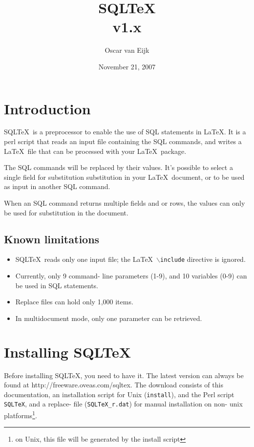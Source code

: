 \documentclass{article}
\newcommand{\bs}{\ensuremath{\backslash}}
\begin{document}
\title{SQL\TeX\\v1.x}
\date{November 21, 2007}
\author{Oscar van Eijk}

\maketitle

\hrulefill

\tableofcontents

\hrulefill

\section{Introduction}

SQL\TeX\ is a preprocessor to enable the use of SQL statements in \LaTeX. It is a perl script that reads
an input file containing the SQL commands, and writes a \LaTeX\ file that can be processed with your
\LaTeX\ package.

The SQL commands will be replaced by their values. It's possible to select a single field for substitution
substitution in your \LaTeX\ document, or to be used as input in another SQL command.

When an SQL command returns multiple fields and or rows, the values can only be used for substitution
in the document.

\subsection{Known limitations}

\begin{itemize}
\item SQL\TeX\ reads only one input file; the \LaTeX\ \texttt{\bs include} directive is ignored.
\item Currently, only 9 command- line parameters (1-9), and 10 variables (0-9) can be used in SQL
statements.
\item Replace files can hold only 1,000 items.
\item In multidocument mode, only one parameter can be retrieved.
\end{itemize}

\section{Installing SQL\TeX}

Before installing SQL\TeX, you need to have it. The latest version can always be found at
\textsf{http://freeware.oveas.com/sqltex}.
The download consists of this do\-cumentation, an installation script for Unix
(\texttt{install}), and the Perl script \texttt{SQLTeX}, and a replace- file (\texttt{SQLTeX\_r.dat}) for manual installation
on non- unix platforms\footnote{on Unix, this file will be generated by the install script}.
\end{document}
